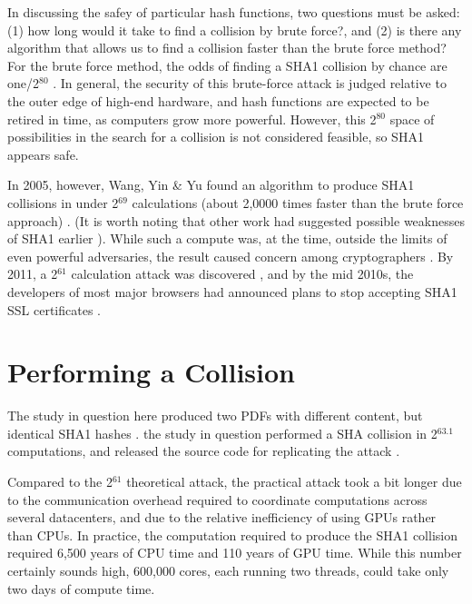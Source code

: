 \documentclass[sigconf]{acmart}
\begin{document}
In discussing the safey of particular hash functions, two questions must be asked:
(1) how long would it take to find a collision by brute force?, and 
(2) is there any algorithm that allows us to find a collision faster than the brute force method?
For the brute force method, the odds of finding a SHA1 collision by chance are one/2\(^{\text{80}}\)
\cite{Schneier2005}.
In general, the security of this brute-force attack is judged relative to the outer edge of high-end hardware, and hash functions are expected to be retired in time, as computers grow more powerful.
However, this 2\(^{\text{80}}\) space of possibilities in the search for a collision is not considered feasible, so SHA1 appears safe.

In 2005, however, Wang, Yin \& Yu found an algorithm to produce SHA1 collisions in under 2\(^{\text{69}}\) calculations (about 2,0000 times faster than the brute force approach)
\cite{Wang2005}.
(It is worth noting that other work had suggested possible weaknesses of SHA1 earlier \cite{Biham2005}).
While such a compute was, at the time, outside the limits of even powerful adversaries,
the result caused concern among cryptographers \cite{Schneier2005}.
By 2011, a 2\(^{\text{61}}\) calculation attack was discovered \cite{Stevens2013a},
and by the mid 2010s, the developers of most major browsers had announced plans to stop accepting SHA1 SSL certificates 
\cite{Mozilla2017,Sleevi2014}.


\section{Performing a Collision}
\label{sec:org698be79}

The study in question here produced two PDFs with different content, but identical SHA1 hashes
\cite{Stevens2017}.
the study in question performed a SHA collision in 2\(^{\text{63.1}}\) computations, 
and released the source code for replicating the attack
\cite{Stevens2017github}.

Compared to the 2\(^{\text{61}}\) theoretical attack, the practical attack took a bit longer due to the communication overhead required to coordinate computations across several datacenters, and due to the relative inefficiency of using GPUs rather than CPUs.
In practice, the computation required to produce the SHA1 collision required 6,500 years of CPU time and 110 years of GPU time. While this number certainly sounds high, 600,000 cores, each running two threads, could take only two days of compute time.
\end{document}
